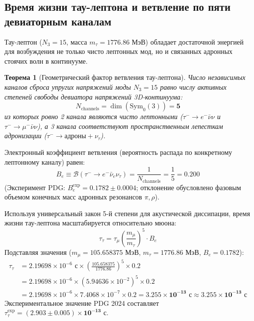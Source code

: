 \documentclass[12pt,a4paper]{article}
\newtheorem{theorem}{Теорема}
\begin{document}
\subsection{Время жизни тау-лептона и ветвление по пяти девиаторным каналам}
Тау-лептон ($N_3=15$, масса $m_\tau = 1776.86$ МэВ) обладает достаточной энергией для возбуждения не только чисто лептонных мод, но и связанных адронных стоячих волн в континууме.

\begin{theorem}[Геометрический фактор ветвления тау-лептона]
	Число независимых каналов сброса упругих напряжений моды $N_3=15$ равно числу активных степеней свободы девиатора напряжений 3D-континуума:
	\begin{equation}
		N_{\mathrm{channels}} = \dim(\mathrm{Sym}_0(3)) = \mathbf{5}
	\end{equation}
	из которых ровно 2 канала являются чисто лептонными ($\tau^- \to e^-\bar{\nu}\nu$ и $\tau^- \to \mu^-\bar{\nu}\nu$), а 3 канала соответствуют пространственным лепесткам адронизации ($\tau^- \to \mathrm{адроны} + \nu_\tau$).
\end{theorem}

Электронный коэффициент ветвления (вероятность распада по конкретному лептонному каналу) равен:
\begin{equation}
	B_e \equiv \mathcal{B}(\tau^- \to e^- \bar{\nu}_e \nu_\tau) = \frac{1}{N_{\text{channels}}} = \frac{1}{5} = \mathbf{0.200}
\end{equation}
(Эксперимент PDG: $B_e^{\text{exp}} = \mathbf{0.1782 \pm 0.0004}$; отклонение обусловлено фазовым объемом конечных масс адронных резонансов $\pi, \rho$).

Используя универсальный закон 5-й степени для акустической диссипации, время жизни тау-лептона масштабируется относительно мюона:
\begin{equation}
	\tau_\tau = \tau_\mu \left( \frac{m_\mu}{m_\tau} \right)^5 \cdot B_e
\end{equation}
Подставляя значения ($m_\mu = 105.658375$ МэВ, $m_\tau = 1776.86$ МэВ, $B_e = 0.1782$):
\begin{align}
	\tau_\tau &= 2.19698 \times 10^{-6} \text{ с} \times \left( \frac{105.658375}{1776.86} \right)^5 \times 0.2 \nonumber \\
	&= 2.19698 \times 10^{-6} \times (5.94636 \times 10^{-2})^5 \times 0.2 \nonumber \\
	&= 2.19698 \times 10^{-6} \times 7.4068 \times 10^{-7} \times 0.2 = \mathbf{3.255 \times 10^{-13} \text{ с}} \approx \mathbf{3.255 \times 10^{-13} \text{ с}}
\end{align}
Экспериментальное значение PDG 2024 составляет $\tau_\tau^{\text{exp}} = \mathbf{(2.903 \pm 0.005) \times 10^{-13} \text{ с}}$.
\end{document}
